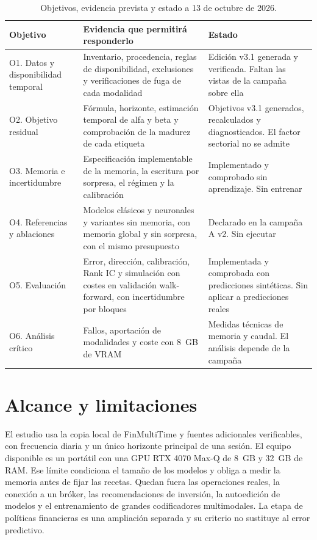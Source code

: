 \documentclass[11pt,a4paper]{report}
\begin{document}
\begin{table}[htbp]
\centering
\small
\caption{Objetivos, evidencia prevista y estado a 13 de octubre de 2026.}
\label{tab:objetivos}
\begin{tabular}{p{3.2cm}p{5.2cm}p{4.6cm}}
\toprule
Objetivo & Evidencia que permitirá responderlo & Estado \\
\midrule
O1. Datos y disponibilidad temporal & Inventario, procedencia, reglas de
disponibilidad, exclusiones y verificaciones de fuga de cada modalidad &
Edición v3.1 generada y verificada. Faltan las vistas de la campaña sobre ella
\\
O2. Objetivo residual & Fórmula, horizonte, estimación temporal de alfa y beta
y comprobación de la madurez de cada etiqueta & Objetivos v3.1 generados,
recalculados y diagnosticados. El factor sectorial no se admite \\
O3. Memoria e incertidumbre & Especificación implementable de la memoria, la
escritura por sorpresa, el régimen y la calibración & Implementado y
comprobado sin aprendizaje. Sin entrenar \\
O4. Referencias y ablaciones & Modelos clásicos y neuronales y variantes sin
memoria, con memoria global y sin sorpresa, con el mismo presupuesto & Declarado
en la campaña A v2. Sin ejecutar \\
O5. Evaluación & Error, dirección, calibración, Rank IC y simulación con
costes en validación walk-forward, con incertidumbre por bloques &
Implementada y comprobada con predicciones sintéticas. Sin aplicar a
predicciones reales \\
O6. Análisis crítico & Fallos, aportación de modalidades y coste con 8~GB de
VRAM & Medidas técnicas de memoria y caudal. El análisis depende de la
campaña \\
\bottomrule
\end{tabular}
\end{table}

\section{Alcance y limitaciones}
El estudio usa la copia local de FinMultiTime y fuentes adicionales
verificables, con frecuencia diaria y un único horizonte principal de una
sesión. El equipo disponible es un portátil con una GPU RTX 4070 Max-Q de
8~GB y 32~GB de RAM. Ese límite condiciona el tamaño de los modelos y obliga
a medir la memoria antes de fijar las recetas. Quedan fuera las operaciones
reales, la conexión a un bróker, las recomendaciones de inversión, la
autoedición de modelos y el entrenamiento de grandes codificadores
multimodales. La etapa de políticas financieras es una ampliación separada y
su criterio no sustituye al error predictivo.
\end{document}
